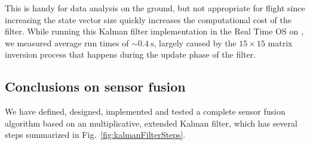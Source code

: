 This is handy for data analysis on the ground, but not appropriate for flight since increasing the state vector size quickly increases the computational cost of the filter. While running this Kalman filter implementation in the Real Time OS on \boop, we measured average run times of $\sim\SI{0.4}{\second}$, largely caused by the $15\times 15$ matrix inversion process that happens during the update phase of the filter.

%
%

\subsection{Conclusions on sensor fusion}

We have defined, designed, implemented and tested a complete sensor fusion algorithm based on an multiplicative, extended Kalman filter, which has several steps summarized in Fig.~\ref{fig:kalmanFilterSteps}.

